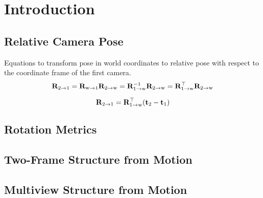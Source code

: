 \chapter{Introduction}

	\section{Relative Camera Pose}
		Equations to transform pose in world coordinates to relative pose with respect to the coordinate frame of the first camera.
		\begin{equation}
			\mathbf{R}_{2 \rightarrow 1} 	= \mathbf{R}_{\text{w} \rightarrow 1} \mathbf{R}_{2 \rightarrow \text{w}}
										= \mathbf{R}_{1 \rightarrow \text{w}}^{-1} \mathbf{R}_{2 \rightarrow \text{w}}
										= \mathbf{R}_{1 \rightarrow \text{w}}^{\top} \mathbf{R}_{2 \rightarrow \text{w}}
		\end{equation}
		
		\begin{equation}
			\mathbf{R}_{2 \rightarrow 1} = \mathbf{R}_{1 \rightarrow \text{w}}^{\top} (\mathbf{t}_2 - \mathbf{t}_1)
		\end{equation}


	\section{Rotation Metrics}
	\cite{huynh2009metrics}
	
	\section{Two-Frame Structure from Motion}
	
	\section{Multiview Structure from Motion}